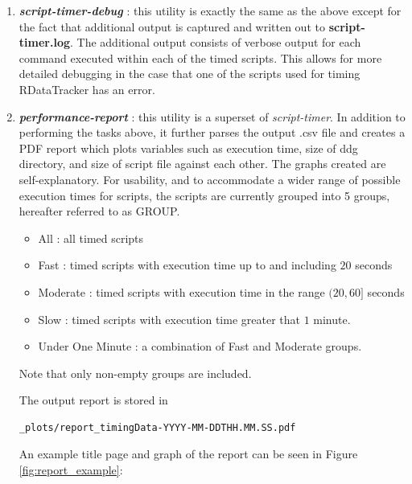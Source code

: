 \documentclass[12pt]{article}
\begin{document}
\begin{enumerate}
\item \textbf{\textit{script-timer-debug}} : this utility is exactly the same as the above except for the fact that additional output is captured and written out to \textbf{script-timer.log}. The additional output consists of verbose output for each command executed within each of the timed scripts. This allows for more detailed debugging in the case that one of the scripts used for timing RDataTracker has an error.
\item \textbf{\textit{performance-report}} : this utility is a superset of \textit{script-timer}. In addition to performing the tasks above, it further parses the output .csv file and creates a PDF report which plots variables such as execution time, size of ddg directory, and size of script file against each other. The graphs created are self-explanatory. For usability, and to accommodate a wider range of possible execution times for scripts, the scripts are currently grouped into 5 groups, hereafter referred to as GROUP. 
\begin{itemize}
\item All : all timed scripts
\item Fast : timed scripts with execution time up to and including $20$ seconds
\item Moderate : timed scripts with execution time in the range $(20, 60]$ seconds
\item Slow : timed scripts with execution time greater that $1$ minute.
\item Under One Minute : a combination of Fast and Moderate groups.
\end{itemize}

Note that only non-empty groups are included. 

The output report is stored in

\begin{lstlisting}
_plots/report_timingData-YYYY-MM-DDTHH.MM.SS.pdf
\end{lstlisting}
An example title page and graph of the report can be seen in Figure \ref{fig:report_example}:


\end{enumerate}
\end{document}
